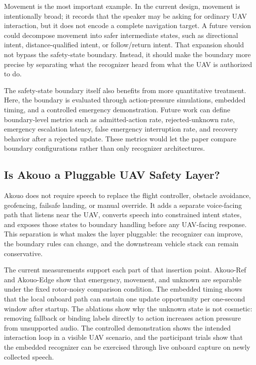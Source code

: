 Movement is the most important example. In the current design, movement is intentionally broad; it records that the speaker may be asking for ordinary UAV interaction, but it does not encode a complete navigation target. A future version could decompose movement into safer intermediate states, such as directional intent, distance-qualified intent, or follow/return intent. That expansion should not bypass the safety-state boundary. Instead, it should make the boundary more precise by separating what the recognizer heard from what the UAV is authorized to do.

The safety-state boundary itself also benefits from more quantitative treatment. Here, the boundary is evaluated through action-pressure simulations, embedded timing, and a controlled emergency demonstration. Future work can define boundary-level metrics such as admitted-action rate, rejected-unknown rate, emergency escalation latency, false emergency interruption rate, and recovery behavior after a rejected update. These metrics would let the paper compare boundary configurations rather than only recognizer architectures.

\subsection{Is Akouo a Pluggable UAV Safety Layer?}

Akouo does not require speech to replace the flight controller, obstacle avoidance, geofencing, failsafe landing, or manual override. It adds a separate voice-facing path that listens near the UAV, converts speech into constrained intent states, and exposes those states to boundary handling before any UAV-facing response. This separation is what makes the layer pluggable: the recognizer can improve, the boundary rules can change, and the downstream vehicle stack can remain conservative.

The current measurements support each part of that insertion point. Akouo-Ref and Akouo-Edge show that emergency, movement, and unknown are separable under the fixed rotor-noisy comparison condition. The embedded timing shows that the local onboard path can sustain one update opportunity per one-second window after startup. The ablations show why the unknown state is not cosmetic: removing fallback or binding labels directly to action increases action pressure from unsupported audio. The controlled demonstration shows the intended interaction loop in a visible UAV scenario, and the participant trials show that the embedded recognizer can be exercised through live onboard capture on newly collected speech.


